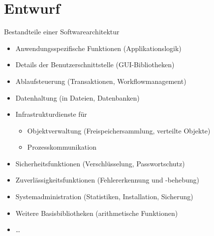 \section{Entwurf}

\begin{bonus}{Bestandteile einer Softwarearchitektur}
    \begin{itemize}
        \item Anwendungsspezifische Funktionen (Applikationslogik)
        \item Details der Benutzerschnittstelle (GUI-Bibliotheken)
        \item Ablaufsteuerung (Transaktionen, Workflowmanagement)
        \item Datenhaltung (in Dateien, Datenbanken)
        \item Infrastrukturdienste für
              \begin{itemize}
                  \item Objektverwaltung (Freispeichersammlung, verteilte Objekte)
                  \item Prozesskommunikation
              \end{itemize}
        \item Sicherheitsfunktionen (Verschlüsselung, Passwortschutz)
        \item Zuverlässigkeitsfunktionen (Fehlererkennung und -behebung)
        \item Systemadministration (Statistiken, Installation, Sicherung)
        \item Weitere Basisbibliotheken (arithmetische Funktionen)
        \item \ldots
    \end{itemize}
\end{bonus}

